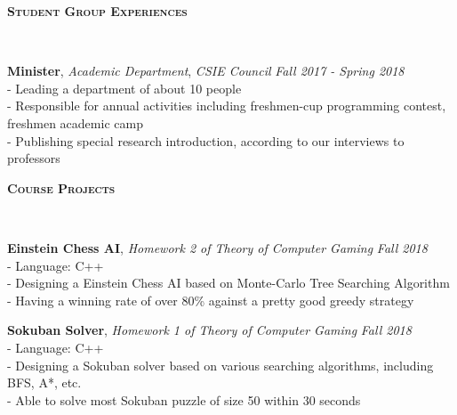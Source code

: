 \documentclass[10pt]{article}
\newenvironment{changemargin}[2]{%
  \begin{list}{}{%
    \setlength{\topsep}{0pt}%
    \setlength{\leftmargin}{#1}%
    \setlength{\rightmargin}{#2}%
    \setlength{\listparindent}{\parindent}%
    \setlength{\itemindent}{\parindent}%
    \setlength{\parsep}{\parskip}%
  }%
  \item[]}{\end{list}
}
\newcommand{\lineover}{
	\begin{changemargin}{-0.05in}{-0.05in}
		\vspace*{-8pt}
		\hrulefill \\
		\vspace*{-2pt}
	\end{changemargin}
}
\newcommand{\header}[1]{
	\begin{changemargin}{-0.5in}{-0.5in}
		\large{\bf \scshape{#1}}\\
  	\lineover
	\end{changemargin}
}
\newenvironment{body} {
	\vspace*{-16pt}
	\begin{changemargin}{-0.25in}{-0.5in}
  }	
	{\end{changemargin}
}
\begin{document}
\smallskip


\header{Student Group Experiences}

\begin{body}
	\vspace{14pt}

	\textbf {Minister}, \textit{Academic Department}, \emph{CSIE Council} \hfill \emph{Fall 2017 - Spring 2018}\\
	    \hspace{12pt} - Leading a department of about 10 people\\
	    \hspace{12pt} - Responsible for annual activities including freshmen-cup programming contest, freshmen academic camp\\
	    \hspace{12pt} - Publishing special research introduction, according to our interviews to professors\\
	\smallskip
	
\end{body}

\smallskip



\header{Course Projects}

\begin{body}
	\vspace{14pt}

	\textbf {Einstein Chess AI}, \textit{Homework 2 of Theory of Computer Gaming} \hfill \emph{Fall 2018}\\
	\smallskip
        \hspace{12pt} - Language: C++\\
	    \hspace{12pt} - Designing a Einstein Chess AI based on Monte-Carlo Tree Searching Algorithm \\
	    \hspace{12pt} - Having a winning rate of over 80\% against a pretty good greedy strategy \\
	\smallskip

	
	\textbf {Sokuban Solver}, \textit{Homework 1 of Theory of Computer Gaming} \hfill \emph{Fall 2018}\\
	\smallskip
        \hspace{12pt} - Language: C++\\
		\hspace{12pt} - Designing a Sokuban solver based on various searching algorithms, including BFS, A*, etc.\\
		\hspace{12pt} - Able to solve most Sokuban puzzle of size 50 within 30 seconds
	\smallskip
	
	
\end{body}
\end{document}
